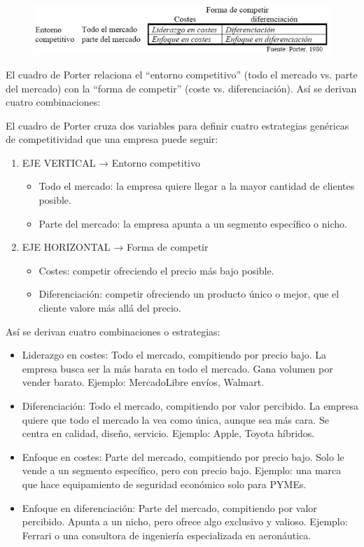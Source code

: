 \documentclass[a4paper,oneside,11pt]{article}
\begin{document}
\begin{figure} [ht!]
    \centering
    \includegraphics[scale=.8]{porter.png}
\end{figure}

El cuadro de Porter relaciona el “entorno competitivo” (todo el mercado vs. parte del mercado) con la “forma de competir” (coste vs. diferenciación). Así se derivan cuatro combinaciones:

El cuadro de Porter cruza dos variables para definir cuatro estrategias genéricas de competitividad que una empresa puede seguir:

\begin{enumerate}
    \item EJE VERTICAL → Entorno competitivo
    \begin{itemize}
        \item Todo el mercado: la empresa quiere llegar a la mayor cantidad de clientes posible.
        \item Parte del mercado: la empresa apunta a un segmento específico o nicho.
    \end{itemize}
    \item EJE HORIZONTAL → Forma de competir
    \begin{itemize}
        \item Costes: competir ofreciendo el precio más bajo posible.
        \item Diferenciación: competir ofreciendo un producto único o mejor, que el cliente valore más allá del precio.
    \end{itemize}
\end{enumerate}

Así se derivan cuatro combinaciones o estrategias:

\begin{itemize}
    \item Liderazgo en costes: Todo el mercado, compitiendo por precio bajo. La empresa busca ser la más barata en todo el mercado. Gana volumen por vender barato. Ejemplo: MercadoLibre envíos, Walmart.

    \item Diferenciación: Todo el mercado, compitiendo por valor percibido. La empresa quiere que todo el mercado la vea como única, aunque sea más cara. Se centra en calidad, diseño, servicio. Ejemplo: Apple, Toyota híbridos.
    
    \item Enfoque en costes: Parte del mercado, compitiendo por precio bajo. Solo le vende a un segmento específico, pero con precio bajo. Ejemplo: una marca que hace equipamiento de seguridad económico solo para PYMEs.
    
    \item Enfoque en diferenciación: Parte del mercado, compitiendo por valor percibido. Apunta a un nicho, pero ofrece algo exclusivo y valioso. Ejemplo: Ferrari o una consultora de ingeniería especializada en aeronáutica.
\end{itemize}
\end{document}
